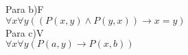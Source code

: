 \documentclass[12pt]{article}
\begin{document}
\begin{itemize}
\begin{itemize}
					Para b)F\\
					$\forall x \forall y ((P(x,y) \wedge P(y,x)) \rightarrow x = y)$\\
					
					Para c)V\\
					$\forall x \forall y (P(a,y) \rightarrow P(x, b))$\\
					
					
					
			\end{itemize}
		
	\end{itemize}
\end{document}
